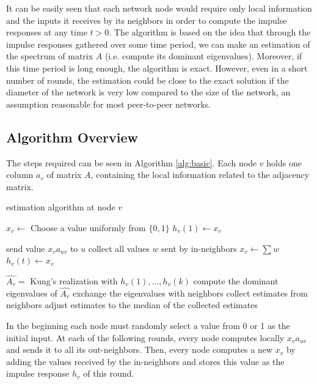 \documentclass[MSc]{icldt}
\begin{document}
It can be easily seen that each network node would require only local information and the inputs it receives by its neighbors in order to compute the impulse responses at any time $t>0$. The algorithm is based on the idea that through the impulse responses gathered over some time period, we can make an estimation of the spectrum of matrix $A$ (i.e. compute its dominant eigenvalues). Moreover, if this time period is long enough, the algorithm is exact. However, even in a short number of rounds, the estimation could be close to the exact solution if the diameter of the network is very low compared to the size of the network, an assumption reasonable for most peer-to-peer networks.

\subsection{Algorithm Overview}

The steps required can be seen in Algorithm \ref{alg:basic}. Each node $v$ holds one column $a_v$ of matrix $A$, containing the local information related to the adjacency matrix.

\begin{algorithm}
\caption{estimation algorithm at node $v$}
\label{alg:basic}
\begin{algorithmic}[1]

\STATE $x_v \leftarrow$  Choose a value uniformly from $\{0,1\}$
\STATE $h_v(1) \leftarrow x_v$


\STATE send value $x_{v}a_{uv}$ to $u$
\STATE collect all values $w$ sent by in-neighbors
\STATE $x_v \leftarrow \sum{w}$
\STATE $h_v(t) \leftarrow x_v$

\ENDFOR

\ENDFOR
\STATE $\hat{A_v} = $ Kung's realization with $h_v(1),\dots, h_v(k)$
\STATE compute the dominant eigenvalues of $\hat{A_v}$
\STATE exchange the eigenvalues with neighbors
\STATE collect estimates from neighbors
\STATE adjust estimates to the median of the collected estimates

\end{algorithmic}
\end{algorithm}

In the beginning each node must randomly select a value from 0 or 1 as the initial input. At each of the following rounds, every node computes locally $x_v a_{uv}$ and sends it to all its out-neighbors. Then, every node computes a new $x_v$ by adding the values received by the in-neighbors and stores this value as the impulse response $h_v$ of this round. 
\end{document}
